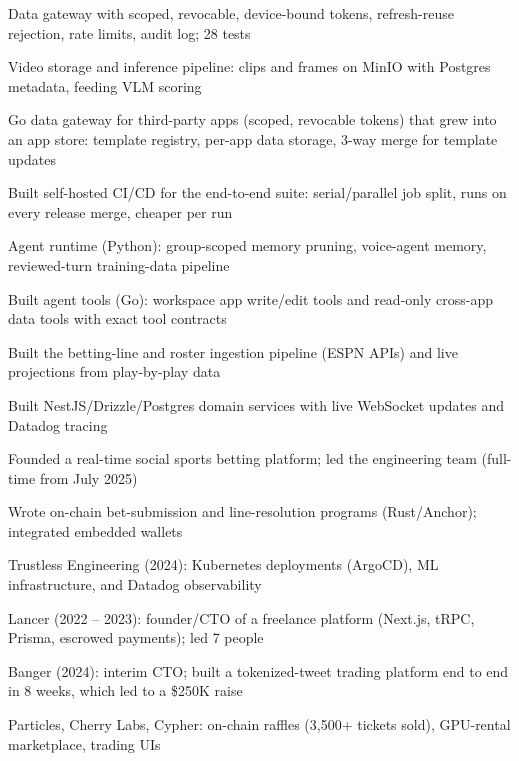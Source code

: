 \documentclass[print]{jack-resume}
\begin{document}
\begin{tightemize}
    \item Data gateway with scoped, revocable, device-bound tokens, refresh-reuse rejection, rate limits, audit log; 28 tests
    \item Video storage and inference pipeline: clips and frames on MinIO with Postgres metadata, feeding VLM scoring
    \item Go data gateway for third-party apps (scoped, revocable tokens) that grew into an app store: template registry, per-app data storage, 3-way merge for template updates
    \item Built self-hosted CI/CD for the end-to-end suite: serial/parallel job split, runs on every release merge, cheaper per run
    \item Agent runtime (Python): group-scoped memory pruning, voice-agent memory, reviewed-turn training-data pipeline
    \item Built agent tools (Go): workspace app write/edit tools and read-only cross-app data tools with exact tool contracts
\end{tightemize}
\sectionsep

\begin{tightemize}
    \item Built the betting-line and roster ingestion pipeline (ESPN APIs) and live projections from play-by-play data
    \item Built NestJS/Drizzle/Postgres domain services with live WebSocket updates and Datadog tracing
    \item Founded a real-time social sports betting platform; led the engineering team (full-time from July 2025)
    \item Wrote on-chain bet-submission and line-resolution programs (Rust/Anchor); integrated embedded wallets
\end{tightemize}
\sectionsep

\begin{tightemize}
    \item Trustless Engineering (2024): Kubernetes deployments (ArgoCD), ML infrastructure, and Datadog observability
    \item Lancer (2022 – 2023): founder/CTO of a freelance platform (Next.js, tRPC, Prisma, escrowed payments); led 7 people
    \item Banger (2024): interim CTO; built a tokenized-tweet trading platform end to end in 8 weeks, which led to a \$250K raise
    \item Particles, Cherry Labs, Cypher: on-chain raffles (3,500+ tickets sold), GPU-rental marketplace, trading UIs
\end{tightemize}
\sectionsep
\end{document}
